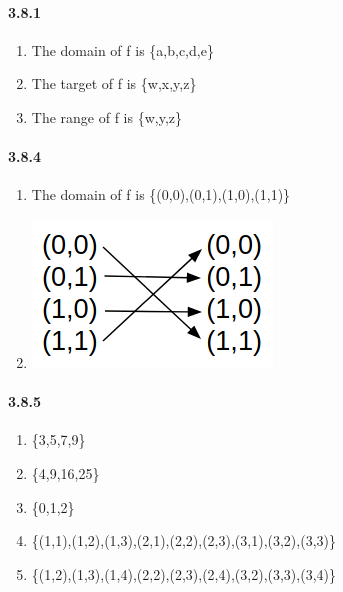 \documentclass[11pt, letterpaper, twocolumn, fleqn]{article}
\begin{document}
    \paragraph{3.8.1}
    \renewcommand{\labelenumi}{\alph{enumi}.}
    \begin{enumerate}
        \item The domain of f is \{a,b,c,d,e\}
        \item The target of f is \{w,x,y,z\}
        \item The range of f is \{w,y,z\}
    \end{enumerate}
    
    \paragraph{3.8.4}
    \renewcommand{\labelenumi}{\alph{enumi}.}
    \begin{enumerate}
        \item The domain of f is \{(0,0),(0,1),(1,0),(1,1)\}
        \item \includegraphics[scale=.5]{3_8_4}
    \end{enumerate}
    
    \paragraph{3.8.5}
    \renewcommand{\labelenumi}{\alph{enumi}.}
    \begin{enumerate}
        \item \{3,5,7,9\}
        \item \{4,9,16,25\}
        \item \{0,1,2\}
        \addtocounter{enumi}{4}
        \item \{(1,1),(1,2),(1,3),(2,1),(2,2),(2,3),(3,1),(3,2),(3,3)\}
        \item \{(1,2),(1,3),(1,4),(2,2),(2,3),(2,4),(3,2),(3,3),(3,4)\}
    \end{enumerate}
    
\end{document}
